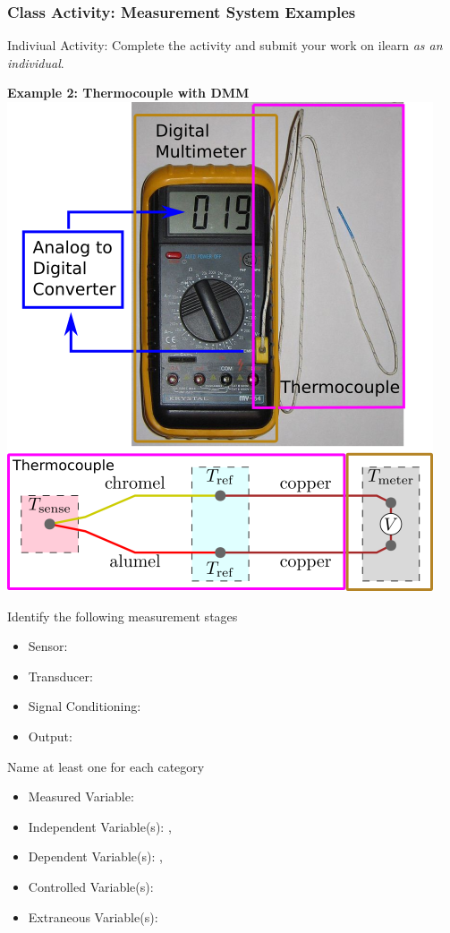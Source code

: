 \documentclass[fleqn]{beamer} %
\newcommand{\sectionIIsubsectionVtitle}{Class Activity: Measurement System Examples}
\begin{document}
			\begin{frame}
				\frametitle{\sectionIIsubsectionVtitle}
				\tiny

				Indiviual Activity: Complete the activity and submit your work on ilearn {\it as an individual}.	

				\begin{multicols}{2}

				\textbf{Example 2: Thermocouple with DMM} \vspc
				\includegraphics[scale=0.2]{images/thermocouple_atd.png} \vspc

				Identify the following measurement stages 
				\begin{itemize}
				\item Sensor: \hspcu
				\item Transducer: \hspcu
				\item Signal Conditioning: \hspcu
				\item Output: \hspcu
				\end{itemize}


				Name at least one for each category 

				\begin{itemize}
				\item Measured Variable: \hspcu \vspc 
				\item Independent Variable(s): \hspcu, \hspcu \vspc
				\item Dependent Variable(s): \hspcu, \hspcu \vspc 
				\item Controlled Variable(s): \hspcu \vspc 
				\item Extraneous Variable(s):\hspcu \vspc
				\end{itemize}


\end{multicols}
\end{frame}
\end{document}
